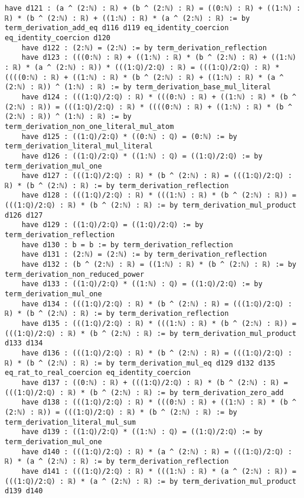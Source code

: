 \documentclass{article}
\begin{document}
\begin{tcolorbox}[colback=white!10, width=\linewidth]
\begin{lstlisting}[language=Lean4]
    have d121 : (a ^ (2:ℕ) : ℝ) + (b ^ (2:ℕ) : ℝ) = ((0:ℕ) : ℝ) + ((1:ℕ) : ℝ) * (b ^ (2:ℕ) : ℝ) + ((1:ℕ) : ℝ) * (a ^ (2:ℕ) : ℝ) := by term_derivation_add_eq d116 d119 eq_identity_coercion eq_identity_coercion d120
    have d122 : (2:ℕ) = (2:ℕ) := by term_derivation_reflection
    have d123 : (((0:ℕ) : ℝ) + ((1:ℕ) : ℝ) * (b ^ (2:ℕ) : ℝ) + ((1:ℕ) : ℝ) * (a ^ (2:ℕ) : ℝ)) * (((1:ℚ)/2:ℚ) : ℝ) = (((1:ℚ)/2:ℚ) : ℝ) * ((((0:ℕ) : ℝ) + ((1:ℕ) : ℝ) * (b ^ (2:ℕ) : ℝ) + ((1:ℕ) : ℝ) * (a ^ (2:ℕ) : ℝ)) ^ (1:ℕ) : ℝ) := by term_derivation_base_mul_literal
    have d124 : (((1:ℚ)/2:ℚ) : ℝ) * (((0:ℕ) : ℝ) + ((1:ℕ) : ℝ) * (b ^ (2:ℕ) : ℝ)) = (((1:ℚ)/2:ℚ) : ℝ) * ((((0:ℕ) : ℝ) + ((1:ℕ) : ℝ) * (b ^ (2:ℕ) : ℝ)) ^ (1:ℕ) : ℝ) := by term_derivation_non_one_literal_mul_atom
    have d125 : ((1:ℚ)/2:ℚ) * ((0:ℕ) : ℚ) = (0:ℕ) := by term_derivation_literal_mul_literal
    have d126 : ((1:ℚ)/2:ℚ) * ((1:ℕ) : ℚ) = ((1:ℚ)/2:ℚ) := by term_derivation_mul_one
    have d127 : (((1:ℚ)/2:ℚ) : ℝ) * (b ^ (2:ℕ) : ℝ) = (((1:ℚ)/2:ℚ) : ℝ) * (b ^ (2:ℕ) : ℝ) := by term_derivation_reflection
    have d128 : (((1:ℚ)/2:ℚ) : ℝ) * (((1:ℕ) : ℝ) * (b ^ (2:ℕ) : ℝ)) = (((1:ℚ)/2:ℚ) : ℝ) * (b ^ (2:ℕ) : ℝ) := by term_derivation_mul_product d126 d127
    have d129 : ((1:ℚ)/2:ℚ) = ((1:ℚ)/2:ℚ) := by term_derivation_reflection
    have d130 : b = b := by term_derivation_reflection
    have d131 : (2:ℕ) = (2:ℕ) := by term_derivation_reflection
    have d132 : (b ^ (2:ℕ) : ℝ) = ((1:ℕ) : ℝ) * (b ^ (2:ℕ) : ℝ) := by term_derivation_non_reduced_power
    have d133 : ((1:ℚ)/2:ℚ) * ((1:ℕ) : ℚ) = ((1:ℚ)/2:ℚ) := by term_derivation_mul_one
    have d134 : (((1:ℚ)/2:ℚ) : ℝ) * (b ^ (2:ℕ) : ℝ) = (((1:ℚ)/2:ℚ) : ℝ) * (b ^ (2:ℕ) : ℝ) := by term_derivation_reflection
    have d135 : (((1:ℚ)/2:ℚ) : ℝ) * (((1:ℕ) : ℝ) * (b ^ (2:ℕ) : ℝ)) = (((1:ℚ)/2:ℚ) : ℝ) * (b ^ (2:ℕ) : ℝ) := by term_derivation_mul_product d133 d134
    have d136 : (((1:ℚ)/2:ℚ) : ℝ) * (b ^ (2:ℕ) : ℝ) = (((1:ℚ)/2:ℚ) : ℝ) * (b ^ (2:ℕ) : ℝ) := by term_derivation_mul_eq d129 d132 d135 eq_rat_to_real_coercion eq_identity_coercion
    have d137 : ((0:ℕ) : ℝ) + (((1:ℚ)/2:ℚ) : ℝ) * (b ^ (2:ℕ) : ℝ) = (((1:ℚ)/2:ℚ) : ℝ) * (b ^ (2:ℕ) : ℝ) := by term_derivation_zero_add
    have d138 : (((1:ℚ)/2:ℚ) : ℝ) * (((0:ℕ) : ℝ) + ((1:ℕ) : ℝ) * (b ^ (2:ℕ) : ℝ)) = (((1:ℚ)/2:ℚ) : ℝ) * (b ^ (2:ℕ) : ℝ) := by term_derivation_literal_mul_sum
    have d139 : ((1:ℚ)/2:ℚ) * ((1:ℕ) : ℚ) = ((1:ℚ)/2:ℚ) := by term_derivation_mul_one
    have d140 : (((1:ℚ)/2:ℚ) : ℝ) * (a ^ (2:ℕ) : ℝ) = (((1:ℚ)/2:ℚ) : ℝ) * (a ^ (2:ℕ) : ℝ) := by term_derivation_reflection
    have d141 : (((1:ℚ)/2:ℚ) : ℝ) * (((1:ℕ) : ℝ) * (a ^ (2:ℕ) : ℝ)) = (((1:ℚ)/2:ℚ) : ℝ) * (a ^ (2:ℕ) : ℝ) := by term_derivation_mul_product d139 d140

\end{lstlisting}
\end{tcolorbox}
\end{document}
